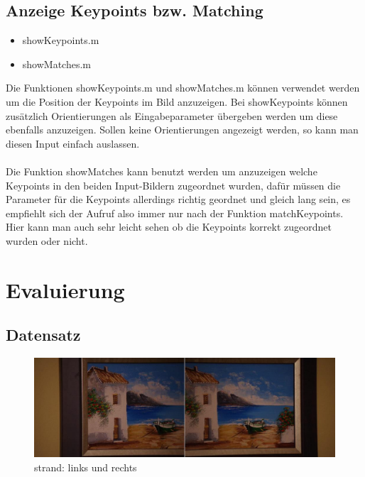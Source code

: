 \documentclass[deutsch]{scrartcl}
\begin{document}
\subsection{Anzeige Keypoints bzw. Matching}
\begin{itemize}
	\item showKeypoints.m
	\item showMatches.m
\end{itemize}
Die Funktionen showKeypoints.m und showMatches.m können verwendet werden um die Position der Keypoints im Bild anzuzeigen. Bei showKeypoints können zusätzlich Orientierungen als Eingabeparameter übergeben werden um diese ebenfalls anzuzeigen. Sollen keine Orientierungen angezeigt werden, so kann man diesen Input einfach auslassen.\\\\
Die Funktion showMatches kann benutzt werden um anzuzeigen welche Keypoints in den beiden Input-Bildern zugeordnet wurden, dafür müssen die Parameter für die Keypoints allerdings richtig geordnet und gleich lang sein, es empfiehlt sich der Aufruf also immer nur nach der Funktion matchKeypoints. Hier kann man auch sehr leicht sehen ob die Keypoints korrekt zugeordnet wurden oder nicht.

\newpage
\section{Evaluierung}

\subsection{Datensatz}

\begin{figure}[p]
\begin{center}
\includegraphics[width=1.0\textwidth]{strand.jpg}
\caption{strand: links und rechts}
\label{fig:strand}
\end{center}
\end{figure}
\end{document}
